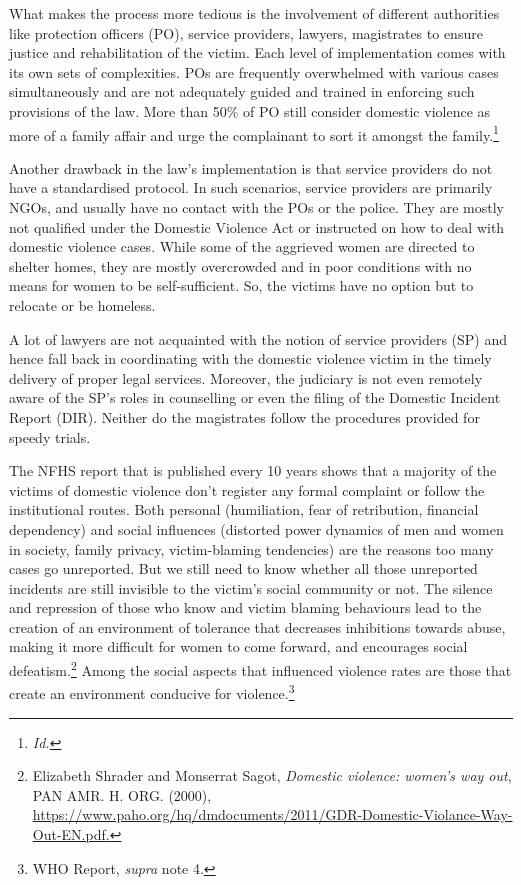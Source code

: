 \begin{multicols}{2}
\noi
What makes the process more tedious is the involvement of different authorities like
protection officers (PO), service providers, lawyers, magistrates to ensure justice and
rehabilitation of the victim. Each level of implementation comes with its own sets of
complexities. POs are frequently overwhelmed with various cases simultaneously and are not
adequately guided and trained in enforcing such provisions of the law. More than 50\% of PO
still consider domestic violence as more of a family affair and urge the complainant to sort it
amongst the family.\footnote{\textit{Id.}}

\noi
Another drawback in the law's implementation is that service providers do not have a
standardised protocol. In such scenarios, service providers are primarily NGOs, and usually
have no contact with the POs or the police. They are mostly not qualified under the Domestic
Violence Act or instructed on how to deal with domestic violence cases. While some of the
aggrieved women are directed to shelter homes, they are mostly overcrowded and in poor
conditions with no means for women to be self-sufficient. So, the victims have no option but
to relocate or be homeless. 

\noi
A lot of lawyers are not acquainted with the notion of service providers (SP) and hence fall
back in coordinating with the domestic violence victim in the timely delivery of proper legal
services. Moreover, the judiciary is not even remotely aware of the SP’s roles in counselling
or even the filing of the Domestic Incident Report (DIR). Neither do the magistrates follow
the procedures provided for speedy trials. 


\noi
The NFHS report that is published every 10 years shows that a majority of the victims of
domestic violence don’t register any formal complaint or follow the institutional routes. Both
personal (humiliation, fear of retribution, financial dependency) and social influences
(distorted power dynamics of men and women in society, family privacy, victim-blaming
tendencies) are the reasons too many cases go unreported. But we still need to know whether
all those unreported incidents are still invisible to the victim's social community or not. The
silence and repression of those who know and victim blaming behaviours lead to the creation
of an environment of tolerance that decreases inhibitions towards abuse, making it more
difficult for women to come forward, and encourages social defeatism.\footnote{Elizabeth Shrader and Monserrat Sagot, \textit{Domestic violence: women’s way out}, PAN AMR. H. ORG. (2000),
\url{https://www.paho.org/hq/dmdocuments/2011/GDR-Domestic-Violance-Way-Out-EN.pdf.}} Among the social
aspects that influenced violence rates are those that create an environment conducive for
violence.\footnote{WHO Report, \textit{supra} note 4.}


\end{multicols}
